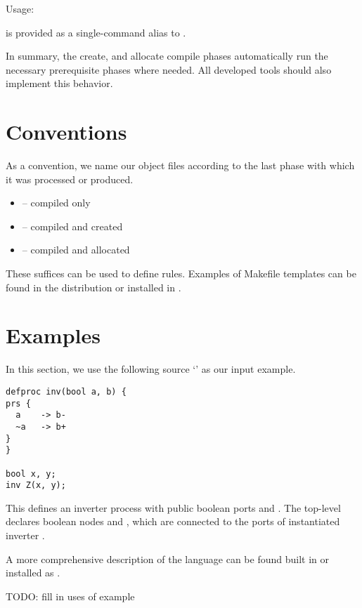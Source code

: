 Usage: \binhackt\   

 is provided as a single-command alias to .  

In summary, 
the create, and allocate compile phases 
automatically run the necessary prerequisite phases where needed.  
All developed tools should also implement this behavior.  


\section{Conventions}
\label{sec:compiler:conventions}

As a convention, we name our object files according to the last
phase with which it was processed or produced.  

\begin{itemize}
\item {} -- compiled only
\item {} -- compiled and created
\item {} -- compiled and allocated
\end{itemize}

These suffices can be used to define  rules.  
Examples of Makefile templates can be found in the distribution
 or installed in .

\section{Examples}
\label{sec:compiler:examples}

In this section, we use the following source `' 
as our input example.  

\begin{verbatim}
defproc inv(bool a, b) {
prs {
  a    -> b-
  ~a   -> b+
}
}

bool x, y;
inv Z(x, y);
\end{verbatim}

This defines an inverter process  with public boolean ports
 and .  
The top-level declares boolean nodes  and , 
which are connected to the ports of instantiated inverter .  

A more comprehensive description of the language can be found built in
 or installed as .  

TODO: fill in uses of example
